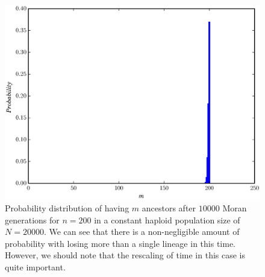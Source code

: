 \documentclass[10pt]{article}
\begin{document}
\begin{center}
\begin{figure}[!h]
	\includegraphics[scale=0.85]{../../plots/figure1}
	\caption{Probability distribution of having $m$ ancestors after $10000$ Moran generations for $n = 200$ in a constant haploid population size of $N = 20000$. We can see that there is a non-negligible amount of probability with losing more than a single lineage in this time. However, we should note that the rescaling of time in this case is quite important.}
\end{figure}
\end{center}
\end{document}
